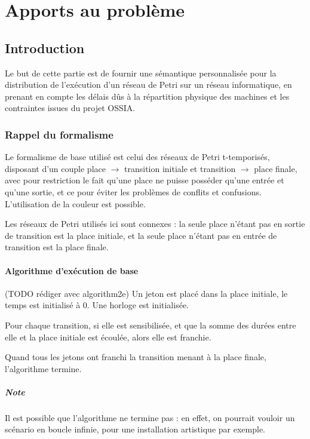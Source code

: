 \chapter{Apports au problème}
\section{Introduction}
Le but de cette partie est de fournir une sémantique  personnalisée pour la distribution de l'exécution d'un réseau de Petri sur un réseau informatique, en prenant en compte les délais dûs à la répartition physique des machines et les contraintes issues du projet \ac{OSSIA}.

\subsection{Rappel du formalisme}
Le formalisme de base utilisé est celui des réseaux de Petri t-temporisés, disposant d'un couple place $\rightarrow$ transition initiale et transition $\rightarrow$ place finale, avec pour restriction le fait qu'une place ne puisse posséder qu'une entrée et qu'une sortie, et ce pour éviter les problèmes de conflits et confusions. L'utilisation de la couleur est possible.

Les réseaux de Petri utilisés ici sont connexes : la seule place n'étant pas en sortie de transition est la place initiale, et la seule place n'étant pas en entrée de transition est la place finale.

\subsubsection{Algorithme d'exécution de base}
(TODO rédiger avec algorithm2e)
Un jeton est placé dans la place initiale, le temps est initialisé à 0. Une horloge est initialisée.

Pour chaque transition, si elle est sensibilisée, et que la somme des durées entre elle et la place initiale est écoulée, alors elle est franchie.

Quand tous les jetons ont franchi la transition menant à la place finale, l'algorithme termine.

\paragraph{Note} Il est possible que l'algorithme ne termine pas : en effet, on pourrait vouloir un scénario en boucle infinie, pour une installation artistique par exemple.

